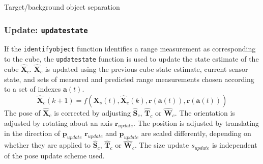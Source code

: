 		\IncMargin{2em}
		\begin{algorithm}
		\DontPrintSemicolon
	
		\caption{Target/background object separation} \label{alg:object}
		\end{algorithm}
		
	\subsubsection{Update: \texttt{updatestate}} 
		If the \texttt{identifyobject} function identifies a range measurement as corresponding to the cube, the \texttt{updatestate} function is used to update the state estimate of the cube $\hat{\mathbf{X}}_c$. $\hat{\mathbf{X}}_c$ is updated using the previous cube state estimate, current sensor state, and sets of measured and predicted range measurements chosen according to a set of indexes $\mathbf{a}(t)$. 
		\begin{equation}
			\hat{\mathbf{X}}_{c}(k+1) = f(\mathbf{X}_{s}(t),\hat{\mathbf{X}}_{c}(k),\mathbf{r}(\mathbf{a}(t)),\hat{\mathbf{r}}(\mathbf{a}(t)))
		\end{equation}	
		The pose of $\hat{\mathbf{X}}_c$ is corrected by adjusting $\hat{\mathbf{S}}_c$, $\hat{\mathbf{T}}_c$ or $\hat{\mathbf{W}}_c$.
		The orientation is adjusted by rotating  about an axis $\mathbf{r}_{update}$. The position is adjusted by translating in the direction of $\mathbf{p}_{update}$
		$\mathbf{r}_{update}$ and $\mathbf{p}_{update}$ are scaled differently, depending on whether they are applied to $\hat{\mathbf{S}}_c$, $\hat{\mathbf{T}}_c$ or $\hat{\mathbf{W}}_c$.
		The size update $s_{update}$ is independent of the pose update scheme used.
		

